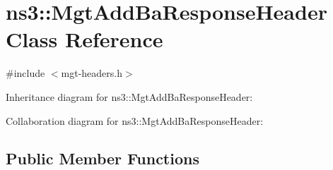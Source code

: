 \hypertarget{classns3_1_1MgtAddBaResponseHeader}{}\section{ns3\+:\+:Mgt\+Add\+Ba\+Response\+Header Class Reference}
\label{classns3_1_1MgtAddBaResponseHeader}


{\ttfamily \#include $<$mgt-\/headers.\+h$>$}



Inheritance diagram for ns3\+:\+:Mgt\+Add\+Ba\+Response\+Header\+:


Collaboration diagram for ns3\+:\+:Mgt\+Add\+Ba\+Response\+Header\+:
\subsection*{Public Member Functions}

